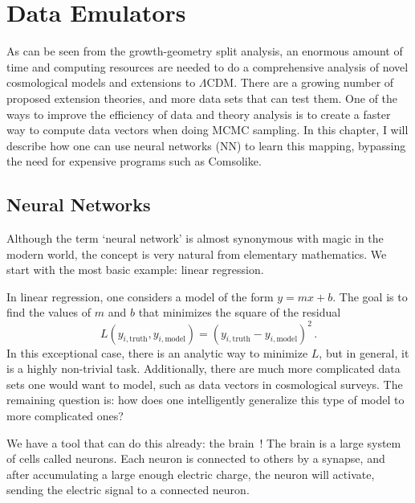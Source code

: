 \chapter{Data Emulators}
As can be seen from the growth-geometry split analysis, an enormous amount of time and computing resources are needed to do a comprehensive analysis of novel cosmological models and extensions to $\Lambda$CDM. There are a growing number of proposed extension theories, and more data sets that can test them. One of the ways to improve the efficiency of data and theory analysis is to create a faster way to compute data vectors when doing MCMC sampling. In this chapter, I will describe how one can use neural networks (NN) to learn this mapping, bypassing the need for expensive programs such as Comsolike.
\section{Neural Networks}
Although the term `neural network' is almost synonymous with magic in the modern world, the concept is very natural from elementary mathematics. We start with the most basic example: linear regression. 

In linear regression, one considers a model of the form $y=mx+b$. The goal is to find the values of $m$ and $b$ that minimizes the square of the residual
\begin{equation}
	L(y_{i,\mathrm{truth}},y_{i,\mathrm{model}}) = (y_{i,\mathrm{truth}} - y_{i,\mathrm{model}})^2\,.
\end{equation}
In this exceptional case, there is an analytic way to minimize $L$, but in general, it is a highly non-trivial task. Additionally, there are much more complicated data sets one would want to model, such as data vectors in cosmological surveys. The remaining question is: how does one intelligently generalize this type of model to more complicated ones?

We have a tool that can do this already: the brain~\cite{noauthor_what_nodate}! The brain is a large system of cells called neurons. Each neuron is connected to others by a synapse, and after accumulating a large enough electric charge, the neuron will activate, sending the electric signal to a connected neuron. 

